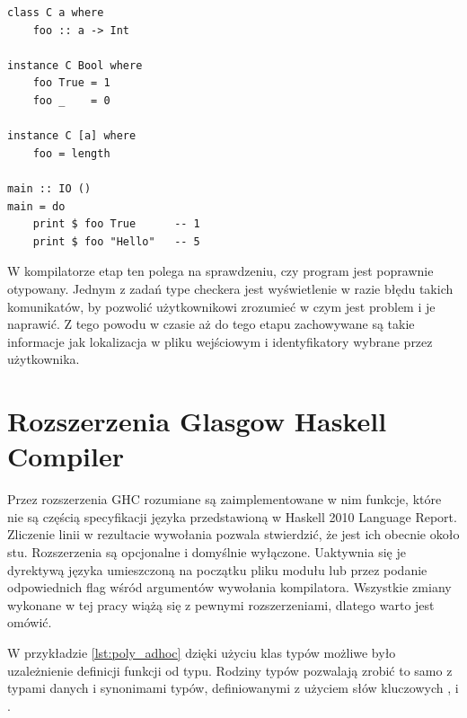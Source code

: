 {\begin{lstlisting}[float,label={lst:poly_adhoc},
                   caption={Przykład użycia polimorfizmu ad-hoc w Haskellu.}]
class C a where
    foo :: a -> Int

instance C Bool where
    foo True = 1
    foo _    = 0

instance C [a] where
    foo = length

main :: IO ()
main = do
    print $ foo True      -- 1
    print $ foo "Hello"   -- 5
\end{lstlisting}

W kompilatorze etap ten 
polega na sprawdzeniu, czy program jest poprawnie
otypowany. Jednym z zadań type checkera jest wyświetlenie w razie błędu takich
komunikatów, by pozwolić użytkownikowi zrozumieć w czym jest problem i je
naprawić. Z tego powodu w czasie aż do tego etapu zachowywane są takie
informacje jak lokalizacja w pliku wejściowym i identyfikatory wybrane przez
użytkownika.

\section{Rozszerzenia Glasgow Haskell Compiler}\label{sec:rozszerzenia_ghc}

Przez rozszerzenia GHC rozumiane są zaimplementowane w nim funkcje, które nie są
częścią specyfikacji języka przedstawioną w Haskell 2010 Language
Report. Zliczenie linii w rezultacie wywołania 
pozwala stwierdzić, że jest ich obecnie około stu. Rozszerzenia są opcjonalne i
domyślnie wyłączone. Uaktywnia się je dyrektywą języka umieszczoną na początku
pliku modułu lub przez podanie odpowiednich flag wśród argumentów wywołania
kompilatora. Wszystkie zmiany wykonane w tej pracy wiążą się z pewnymi
rozszerzeniami, dlatego warto jest omówić. 

\label{sec:rodziny_typow}

W przykładzie \ref{lst:poly_adhoc} dzięki użyciu klas typów możliwe było
uzależnienie definicji funkcji od typu. Rodziny typów pozwalają zrobić to samo z
typami danych i synonimami typów, definiowanymi z użyciem słów kluczowych
,  i . 

}
